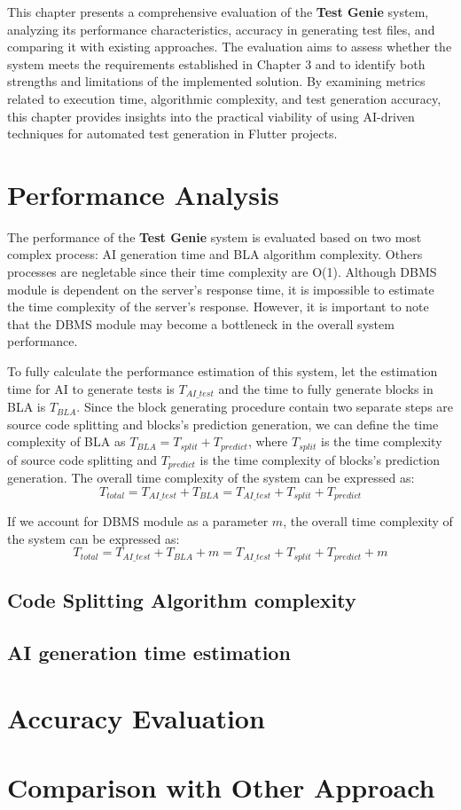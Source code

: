 This chapter presents a comprehensive evaluation of the \textbf{Test Genie} system, analyzing its performance characteristics, accuracy in generating test files, and comparing it with existing approaches. The evaluation aims to assess whether the system meets the requirements established in Chapter 3 and to identify both strengths and limitations of the implemented solution. By examining metrics related to execution time, algorithmic complexity, and test generation accuracy, this chapter provides insights into the practical viability of using AI-driven techniques for automated test generation in Flutter projects.

\section{Performance Analysis}

The performance of the \textbf{Test Genie} system is evaluated based on two most complex process: AI generation time and BLA algorithm complexity. Others processes are negletable since their time complexity are O(1). Although DBMS module is dependent on the server's response time, it is impossible to estimate the time complexity of the server's response. However, it is important to note that the DBMS module may become a bottleneck in the overall system performance.

To fully calculate the performance estimation of this system, let the estimation time for AI to generate tests is $T_{AI\_test}$ and the time to fully generate blocks in BLA is $T_{BLA}$. Since the block generating procedure contain two separate steps are source code splitting and blocks's prediction generation, we can define the time complexity of BLA as $T_{BLA} = T_{split} + T_{predict}$, where $T_{split}$ is the time complexity of source code splitting and $T_{predict}$ is the time complexity of blocks's prediction generation. The overall time complexity of the system can be expressed as:
\begin{equation}
T_{total} = T_{AI\_test} + T_{BLA} = T_{AI\_test} + T_{split} + T_{predict}
\end{equation}

If we account for DBMS module as a parameter $m$, the overall time complexity of the system can be expressed as:
\begin{equation}
T_{total} = T_{AI\_test} + T_{BLA} + m = T_{AI\_test} + T_{split} + T_{predict} + m
\end{equation}


\subsection{Code Splitting Algorithm complexity}

\subsection{AI generation time estimation}


\section{Accuracy Evaluation}

\section{Comparison with Other Approach}
